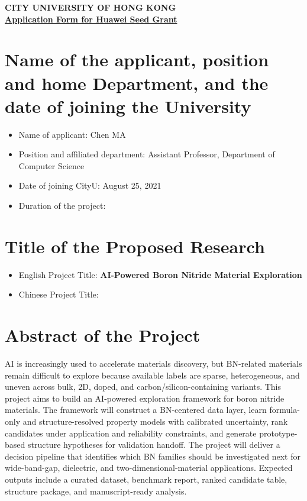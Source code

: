 \documentclass[10pt,a4paper]{article}
\newcommand{\blank}[1][7em]{\colorbox{yellow!35}{\rule{0pt}{1.05em}\hspace{#1}}}
\begin{document}
\vspace*{-34pt}
\begin{center}
    \textbf{CITY UNIVERSITY OF HONG KONG}\\
    \vspace{6pt}
    \underline{\textbf{Application Form for Huawei Seed Grant}}
\end{center}

\section{Name of the applicant, position and home Department, and the date of joining the University}
\begin{itemize}[leftmargin=15pt]
    \item Name of applicant: Chen MA
    \item Position and affiliated department: Assistant Professor, Department of Computer Science
    \item Date of joining CityU: August 25, 2021
    \item Duration of the project: \blank[18em]
\end{itemize}

\section{Title of the Proposed Research}
\begin{itemize}[leftmargin=15pt]
    \item English Project Title: \textbf{AI-Powered Boron Nitride Material Exploration}
    \item Chinese Project Title: \blank[18em]
\end{itemize}

\section{Abstract of the Project}
AI is increasingly used to accelerate materials discovery, but BN-related materials remain difficult to explore because available labels are sparse, heterogeneous, and uneven across bulk, 2D, doped, and carbon/silicon-containing variants. This project aims to build an AI-powered exploration framework for boron nitride materials. The framework will construct a BN-centered data layer, learn formula-only and structure-resolved property models with calibrated uncertainty, rank candidates under application and reliability constraints, and generate prototype-based structure hypotheses for validation handoff. The project will deliver a decision pipeline that identifies which BN families should be investigated next for wide-band-gap, dielectric, and two-dimensional-material applications. Expected outputs include a curated dataset, benchmark report, ranked candidate table, structure package, and manuscript-ready analysis.
\end{document}
